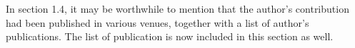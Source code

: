 \replyToComment
    {In section 1.4, it may be worthwhile to mention that the author's contribution had been published in various venues, together with a list of author's publications.}
    {The list of publication is now included in this section as well.}

%
%


